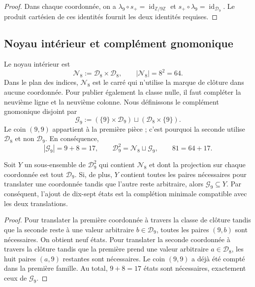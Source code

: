 \begin{proof}
Dans chaque coordonnée, on a
\(\lambda_9\circ s_+=\operatorname{id}_{\mathbb Z/9\mathbb Z}\) et
\(s_+\circ\lambda_9=\operatorname{id}_{\mathcal D_9}\). Le produit
cartésien de ces identités fournit les deux identités requises.
\end{proof}

\subsection{Noyau intérieur et complément gnomonique}

Le noyau intérieur est
\[
 \mathcal N_8:=\mathcal D_8\times\mathcal D_8,
 \qquad |\mathcal N_8|=8^2=64.
\]
Dans le plan des indices, \(\mathcal N_8\) est le carré qui n’utilise la
marque de clôture dans aucune coordonnée. Pour publier également la classe nulle,
il faut compléter la neuvième ligne et la neuvième colonne. Nous définissons le
complément gnomonique disjoint par
\[
 \mathcal G_9:=
  (\{9\}\times\mathcal D_9)
  \sqcup
  (\mathcal D_8\times\{9\}).
\]
Le coin \((9,9)\) appartient à la première pièce ; c’est pourquoi la seconde utilise
\(\mathcal D_8\) et non \(\mathcal D_9\). En conséquence,
\[
 |\mathcal G_9|=9+8=17,
 \qquad
 \mathcal D_9^2=\mathcal N_8\sqcup\mathcal G_9,
 \qquad
 81=64+17.
\]

\begin{proposition}
\label{p12-83-c1-s2:prop:app-minimalidad-completacion}
Soit \(Y\) un sous-ensemble de \(\mathcal D_9^2\) qui contient
\(\mathcal N_8\) et dont la projection sur chaque coordonnée est tout
\(\mathcal D_9\). Si, de plus, \(Y\) contient toutes les paires nécessaires
pour translater une coordonnée tandis que l’autre reste arbitraire,
alors \(\mathcal G_9\subseteq Y\). Par conséquent, l’ajout de dix-sept
états est la complétion minimale compatible avec les deux translations.
\end{proposition}

\begin{proof}
Pour translater la première coordonnée à travers la classe de clôture tandis que
la seconde reste à une valeur arbitraire \(b\in\mathcal D_9\), toutes les paires
\((9,b)\) sont nécessaires. On obtient neuf états. Pour
translater la seconde coordonnée à travers la clôture tandis que la première prend
une valeur arbitraire \(a\in\mathcal D_8\), les huit paires
\((a,9)\) restantes sont nécessaires. Le coin \((9,9)\) a déjà été compté dans la première
famille. Au total, \(9+8=17\) états sont nécessaires, exactement ceux de
\(\mathcal G_9\).
\end{proof}

